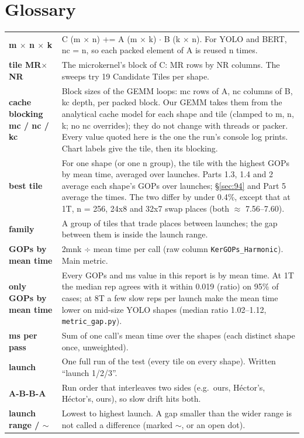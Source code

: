 \section*{Glossary}
{\small
\begin{tabularx}{\textwidth}{@{}>{\bfseries}p{3.6cm} X@{}}
\toprule
m $\times$ n $\times$ k & C (m $\times$ n) += A (m $\times$ k) $\cdot$ B (k $\times$ n). For YOLO and BERT, nc = n, so each packed element of A is reused n times. \\
tile MR$\times$NR & The microkernel's block of C: MR rows by NR columns. The sweeps try 19 Candidate Tiles per shape. \\
cache blocking mc / nc / kc & Block sizes of the GEMM loops: mc rows of A, nc columns of B, kc depth, per packed block. Our GEMM takes them from the analytical cache model for each shape and tile (clamped to m, n, k; no nc overrides); they do not change with threads or packer. Every value quoted here is the one the run's console log prints. Chart labels give the tile, then its blocking. \\
best tile & For one shape (or one n group), the tile with the highest GOPs by mean time, averaged over launches. Parts 1.3, 1.4 and 2 average each shape's GOPs over launches; \S\ref{sec:94} and Part 5 average the times. The two differ by under 0.4\%, except that at 1T, n = 256, 24x8 and 32x7 swap places (both $\approx$ 7.56--7.60). \\
family & A group of tiles that trade places between launches; the gap between them is inside the launch range. \\
GOPs by mean time & 2mnk $\div$ mean time per call (raw column \texttt{KerGOPs\_Harmonic}). Main metric. \\
only GOPs by mean time & Every GOPs and ms value in this report is by mean time. At 1T the median rep agrees with it within 0.019 (ratio) on 95\% of cases; at 8T a few slow reps per launch make the mean time lower on mid-size YOLO shapes (median ratio 1.02--1.12, \texttt{metric\_gap.py}). \\
ms per pass & Sum of one call's mean time over the shapes (each distinct shape once, unweighted). \\
launch & One full run of the test (every tile on every shape). Written ``launch 1/2/3''. \\
A-B-B-A & Run order that interleaves two sides (e.g.\ ours, H\'ector's, H\'ector's, ours), so slow drift hits both. \\
launch range / $\sim$ & Lowest to highest launch. A gap smaller than the wider range is not called a difference (marked $\sim$, or an open dot). \\

\end{tabularx}}
